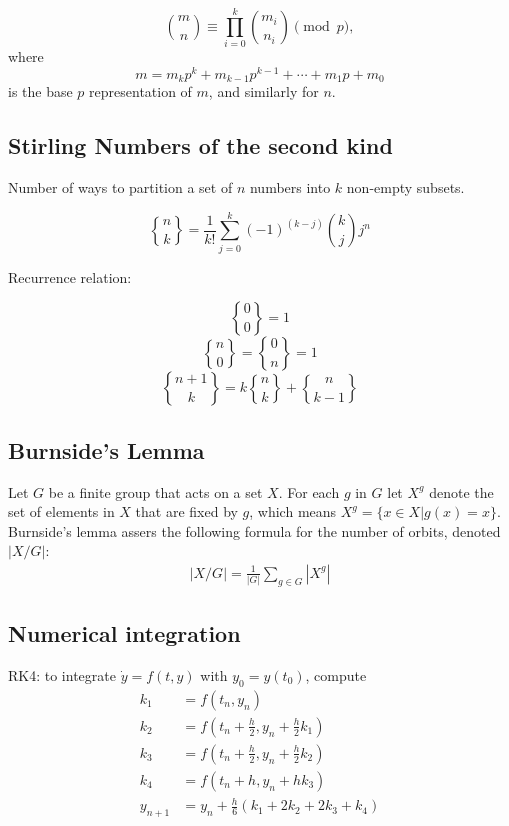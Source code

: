 \documentclass[a4paper,11pt]{article}
\begin{document}
\begin{landscape}
\begin{multicols}{2}
$$\binom{m}{n}\equiv\prod_{i=0}^k\binom{m_i}{n_i}\pmod p,$$
where
$$m=m_kp^k+m_{k-1}p^{k-1}+\cdots +m_1p+m_0$$
is the base $p$ representation of $m$, and similarly for $n$.

\subsection{Stirling Numbers of the second kind}
Number of ways to partition a set of $n$ numbers into $k$ non-empty subsets.

$${n \brace k}=\frac{1}{k!}\sum_{j=0}^{k}(-1)^{(k-j)}{k \choose j}j^n$$

Recurrence relation:

  $${0 \brace 0}=1$$
  $${n \brace 0}={0 \brace n}=1$$
  $${n+1 \brace k}=k{n \brace k}+{n \brace k-1}$$


\subsection{Burnside's Lemma}
Let $G$ be a finite group that acts on a set $X$. For each $g$ in $G$ let $X^g$ denote the set of elements in $X$ that are fixed by $g$, which means $X^g=\{x\in X| g(x)=x\}$. Burnside's lemma assers the following formula for the number of orbits, denoted $|X/G|$:
\begin{align*}
|X/G|=\frac{1}{|G|} \sum_{g\in G} |X^g|
\end{align*}

\subsection{Numerical integration}
RK4: to integrate $\dot{y} = f(t, y)$ with $y_0 = y(t_0)$, compute
\begin{align*}
  k_1 &= f(t_n, y_n) \\
  k_2 &= f(t_n + \frac h 2, y_n + \frac h 2 k_1) \\
  k_3 &= f(t_n + \frac h 2, y_n + \frac h 2 k_2) \\
  k_4 &= f(t_n + h, y_n + h k_3) \\
  y_{n+1} &= y_n + \frac h 6 (k_1 + 2k_2 + 2k_3 + k_4) 
\end{align*}

\end{multicols}


\end{landscape}
\end{document}
